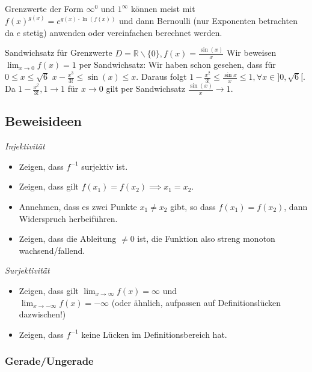 \documentclass[a4paper,fontsize = 7pt]{scrartcl}
\def\limxo{\lim_{x\to 0}}
\def\R{\mathbb{R}}
\begin{document}
Grenzwerte der Form $\infty^0$ und $1^\infty$ können meist mit $f(x)^{g(x)} = e^{g(x)\cdot \ln(f(x))}$ und dann Bernoulli (nur Exponenten betrachten da $e$ stetig) anwenden oder vereinfachen berechnet werden.

\begin{subbox}{Sandwichsatz für Grenzwerte}
  \vspace{-4pt}
  $D = \R \backslash \{0\}, f(x) = \frac{\sin (x)}{x}$
  Wir beweisen $\limxo f(x) = 1$ per Sandwichsatz:
  Wir haben schon gesehen, dass für $0 \leq x \leq \sqrt{6}$ $x - \frac{x^3}{3!} \leq \sin (x) \leq x$. Daraus folgt $1 - \frac{x^2}{3!} \leq \frac{\sin x}{x} \leq 1, \forall x \in ]0, \sqrt{6}[$.\\
  Da $1 - \frac{x^2}{3!}, 1 \to 1$ für $x \to 0$ gilt per Sandwichsatz $\frac{\sin(x)}{x} \to 1$.
  \vspace{-4pt}
\end{subbox}

\subsection{Beweisideen}%

\emph{Injektivität}
\begin{itemize}
	\item Zeigen, dass $f^{-1}$ surjektiv ist.
	\item Zeigen, dass gilt $f(x_1)=f(x_2) \implies x_1=x_2$.
	\item Annehmen, dass es zwei Punkte $x_1 \neq x_2$ gibt, so dass $f(x_1) = f(x_2)$, dann Widerspruch herbeiführen.
	\item Zeigen, dass die Ableitung $\neq 0$ ist, die Funktion also streng monoton wachsend/fallend.
\end{itemize}

\emph{Surjektivität}
\begin{itemize}
	\item Zeigen, dass gilt $\lim_{x\rightarrow\infty}f(x)=\infty$ und \\$\lim_{x\rightarrow-\infty}f(x)=-\infty$ (oder ähnlich, aufpassen auf Definitionslücken dazwischen!)
	\item Zeigen, dass $f^{-1}$ keine Lücken im Definitionsbereich hat.
\end{itemize}

\subsubsection{Gerade/Ungerade}%
\end{document}
